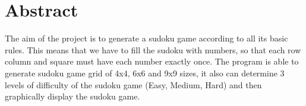 \documentclass{report}
\begin{document}
\chapter*{Abstract}
The aim of the project is to generate a sudoku game according to all its basic rules. This means that we have to fill the sudoku with numbers, so that each row column and square must have each number exactly once. The program is able to generate sudoku game grid of 4x4, 6x6 and 9x9 sizes, it also can determine 3 levels of difficulty of the sudoku game (Easy, Medium, Hard) and then graphically display the sudoku game.


\renewcommand{\contentsname}{Obsah}
\tableofcontents







\end{document}

